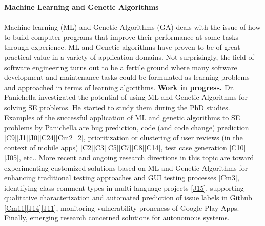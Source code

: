 \documentclass[10pt]{article}
\newcommand{\blankline}{\quad\pagebreak[3]}
\begin{document}
\textbf{Machine Learning and Genetic Algorithms}
\blankline\\\\
Machine learning (ML) and Genetic Algorithms (GA) deals with the issue of how to build computer programs that improve their performance at some tasks through experience. ML and Genetic algorithms have proven to be of great practical value in a variety of application domains. Not surprisingly, the field of software engineering turns out to be a fertile ground where many software development and maintenance tasks could be formulated as learning problems and approached in terms of learning algorithms. 
   \textbf{Work in progress.} Dr. Panichella investigated the potential of using ML and Genetic Algorithms for solving SE problems. He started to study them during the PhD studies. Examples of the successful application of  ML and genetic algorithms to SE problems by Panichella are  bug prediction, code (and code change) prediction  \ref{C9}\ref{J1}\ref{J0}\ref{C24}\ref{Cm2_2},  
 prioritization or clustering of user reviews (in the context of mobile apps) \ref{C2}\ref{C3}\ref{C5}\ref{C7}\ref{C8}\ref{C14}, test case generation \ref{C10}\ref{J05}, etc..  More recent and ongoing research directions in this topic are toward experimenting customized solutions based on ML and Genetic Algorithms for enhancing traditional testing approaches and GUI testing processes \ref{Cm3}, identifying class comment types in multi-language projects \ref{J15}, supporting qualitative characterization and automated prediction of issue labels in Github \ref{Cm11}\ref{J14}\ref{J11},  monitoring vulnerability-proneness of Google Play Apps. Finally, emerging research concerned solutions for autonomous systems.
  \\
   \\
\end{document}
